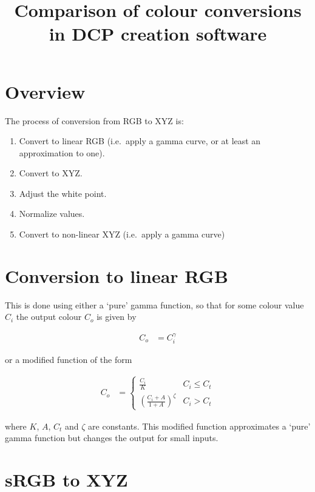 \documentclass{article}
\title{Comparison of colour conversions in DCP creation software}
\author{}
\date{}
\begin{document}
\maketitle

\section{Overview}

The process of conversion from RGB to XYZ is:

\begin{enumerate}
\item Convert to linear RGB (i.e.\ apply a gamma curve, or at least an approximation to one).
\item Convert to XYZ.
\item Adjust the white point.
\item Normalize values.
\item Convert to non-linear XYZ (i.e.\ apply a gamma curve)
\end{enumerate}


\section{Conversion to linear RGB}

This is done using either a `pure' gamma function, so that for some colour value $C_i$ the output colour $C_o$ is given by

\begin{align*}
C_o &= C_i ^ \gamma
\end{align*}

or a modified function of the form

\begin{align*}
C_o &= \left\{
\begin{array}{ll}
\frac{C_i}{K} & C_i \leq C_t \\
\left( \frac{C_i + A}{1 + A} \right)^\zeta & C_i > C_t
\end{array}
\right.
\end{align*}

where $K$, $A$, $C_t$ and $\zeta$ are constants.  This modified function approximates a `pure' gamma function but changes the output for small inputs.

\section{sRGB to XYZ}
\end{document}
